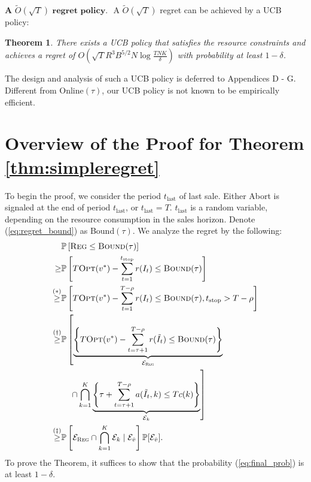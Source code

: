 \documentclass{article}
\newtheorem{theorem}{Theorem}[section]
\theoremstyle{definition}
\newcommand{\PPP}{\mathbb{P}}
\begin{document}
$\textbf{A $\tilde{O}(\sqrt{T})$ regret policy. }$ A $\tilde{O}(\sqrt{T})$ regret can be achieved by a UCB policy:%
\begin{theorem}\label{thm:regret-short}
There exists a UCB policy that satisfies the resource constraints and achieves a regret of $O\left(\sqrt{T} R^3 B^{5/2} N \log{\frac{TNK}{\delta}}\right)$ with probability at least $1-\delta$. 
\end{theorem}
The design and analysis of such a UCB policy is deferred to Appendices D - G. %
Different from {\sc Online$(\tau)$}, our UCB policy is not known to be empirically efficient.%

\section{Overview of the Proof for Theorem \ref{thm:simpleregret}}\label{sec:analysis}
To begin the proof, we consider the period $t_\text{last}$ of last sale. Either {\sc Abort} is signaled at the end of period $t_{\text{last}}$, or $t_{\text{last}}=T$. $t_\text{last}$ is a random variable, depending on the resource consumption in the sales horizon. Denote (\ref{eq:regret_bound}) as {\sc Bound}$(\tau)$. We analyze the regret by the following:
\begin{align}
&\PPP\left[\text{\sc Reg}\leq  \text{{\sc Bound}}(\tau)\right] \nonumber\\
\geq &\PPP\left[T \text{{\sc Opt}}(v^*) - \sum^{t_\text{stop}}_{t=1} r(I_t)\leq \text{{\sc Bound}}(\tau)\right]\nonumber\\
\overset{(*)}{\geq} &\PPP\left[T \text{{\sc Opt}}(v^*) - \sum^{T-\rho}_{t=1} r(I_t)\leq \text{{\sc Bound}}(\tau), t_\text{stop} > T-\rho\right] \nonumber\\
\overset{(\dagger)}{\geq} &\PPP\left[\underbrace{\left\{T \text{{\sc Opt}}(v^*)  - \sum^{T-\rho}_{t=\tau + 1} r(\tilde{I}_t) \leq \text{{\sc Bound}}(\tau)\right\}}_{\mathcal{E}_\text{{\sc Reg}}}\right. \nonumber\\
&\quad\left. \cap \bigcap^{K}_{k = 1}\underbrace{\left\{\tau + \sum^{T-\rho}_{t=\tau + 1}a(\tilde{I}_t, k)\leq Tc(k)\right\}}_{\mathcal{E}_k} \right] \nonumber \\
\overset{(\ddagger)}{\geq} & \PPP\left[\mathcal{E}_{\text{{\sc Reg}}} \cap \bigcap^{K}_{k=1} \mathcal{E}_{k} \mid \mathcal{E}_{\hat{v}}\right]\PPP[\mathcal{E}_{\hat{v}}] \label{eq:final_prob}.
\end{align}
To prove the Theorem, it suffices to show that the probability (\ref{eq:final_prob}) is at least $1-\delta$. 
\end{document}

